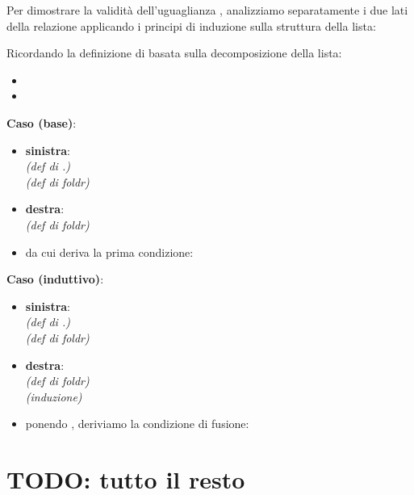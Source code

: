 \documentclass[a4paper,11pt]{report}
\begin{document}
\begin{proofframe}[title=Derivazione formale]
Per dimostrare la validità dell'uguaglianza , analizziamo separatamente i due lati della relazione applicando i principi di induzione sulla struttura della lista:

Ricordando la definizione di  basata sulla decomposizione della lista:
\begin{itemize}
    \item {}
    \item {} 
\end{itemize}

\textbf{Caso \code{[]} (base)}:
\begin{itemize}
    \item \textbf{sinistra}:  \\
         \textit{ (def di .)} \\
     \textit{(def di foldr)}
\item \textbf{destra}:    \\
           \textit{(def di foldr)}
    \item da cui deriva la prima condizione: 
\end{itemize}

\textbf{Caso  (induttivo)}:
\begin{itemize}
    \item \textbf{sinistra}:  \\
          \textit{ (def di .)}\\
         \textit{ (def di foldr)} 
    \item \textbf{destra}:  \\
         \textit{ (def di foldr)} \\
         \textit{ (induzione)}
      \item ponendo , deriviamo la condizione di fusione:
          \subitem{}
\end{itemize}
\end{proofframe}

\section{TODO: tutto il resto}
\end{document}
